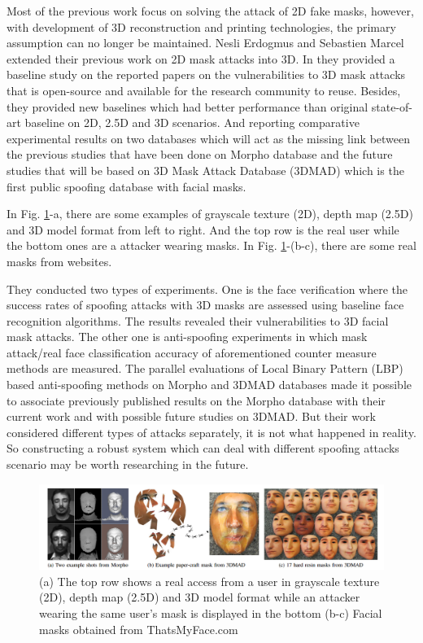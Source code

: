 \documentclass[journal]{IEEEtran}
\begin{document}
Most of the previous work focus on solving the attack of 2D fake masks, however, with development of 3D reconstruction and printing technologies, the primary assumption can no longer be maintained. Nesli Erdogmus and Sebastien Marcel extended their previous work \cite{erdogmus2013spoofing} on 2D mask attacks into 3D. In \cite{erdogmus2014spoofing} they provided a baseline study on the reported papers on the vulnerabilities to 3D mask attacks that is open-source and available for the research community to reuse. Besides, they provided new baselines which had better performance than original state-of-art baseline on 2D, 2.5D and 3D scenarios. And reporting comparative experimental results on two databases which will act as the missing link between the previous studies that have been done on Morpho database and the future studies that will be based on 3D Mask Attack Database (3DMAD) which is the first public spoofing database with facial masks.

In Fig. \ref{fig_3D_1}-a, there are some examples of grayscale texture (2D), depth map (2.5D) and 3D model format from left to right. And the top row is the real user while the bottom ones are a attacker wearing masks. In Fig. \ref{fig_3D_1}-(b-c), there are some real masks from websites.

They conducted two types of experiments. One is the face verification where the success rates of spoofing attacks with 3D masks are assessed using baseline face recognition algorithms. The results revealed their vulnerabilities to 3D facial mask attacks. The other one is anti-spoofing experiments in which mask attack/real face classification accuracy of aforementioned counter measure methods are measured. The parallel evaluations of Local Binary Pattern (LBP) \cite{kose2013countermeasure} based anti-spoofing methods on Morpho and 3DMAD databases made it possible to associate previously published results on the Morpho database with their current work and with possible future studies on 3DMAD. But their work considered different types of attacks separately, it is not what happened in reality. So constructing a robust system which can deal with different spoofing attacks scenario may be worth researching in the future.


\begin{figure}[!t]
\centering
\includegraphics[width=1\linewidth]{img/3D_1}
\caption{(a) The top row shows a real access from a user in grayscale texture (2D), depth map (2.5D) and 3D model format while an attacker wearing the same user's mask is displayed in the bottom (b-c) Facial masks obtained from ThatsMyFace.com}
\label{fig_3D_1}
\end{figure}
\end{document}
